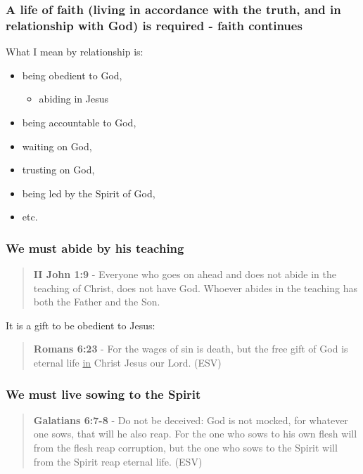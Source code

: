 \documentclass[11pt]{article}
\begin{document}
\subsubsection{A life of faith (living in accordance with the truth, and in relationship with God) is required - faith continues}
\label{sec:orga5761dc}
What I mean by relationship is:
\begin{itemize}
\item being obedient to God,
\begin{itemize}
\item abiding in Jesus
\end{itemize}
\item being accountable to God,
\item waiting on God,
\item trusting on God,
\item being led by the Spirit of God,
\item etc.
\end{itemize}

\subsubsection{We must abide by his teaching}
\label{sec:org0cab170}

\begin{quote}
\textbf{II John 1:9} - Everyone who goes on ahead and does not abide in the teaching of Christ, does not have God. Whoever abides in the teaching has both the Father and the Son.
\end{quote}

It is a gift to be obedient to Jesus:

\begin{quote}
\textbf{Romans 6:23} - For the wages of sin is death, but the free gift of God is eternal life \uline{in} Christ Jesus our Lord. (ESV)
\end{quote}

\subsubsection{We must live sowing to the Spirit}
\label{sec:org2b7dc4e}

\begin{quote}
\textbf{Galatians 6:7-8} - Do not be deceived: God is not mocked, for whatever one sows, that will he also reap. For the one who sows to his own flesh will from the flesh reap corruption, but the one who sows to the Spirit will from the Spirit reap eternal life. (ESV)
\end{quote}
\end{document}
